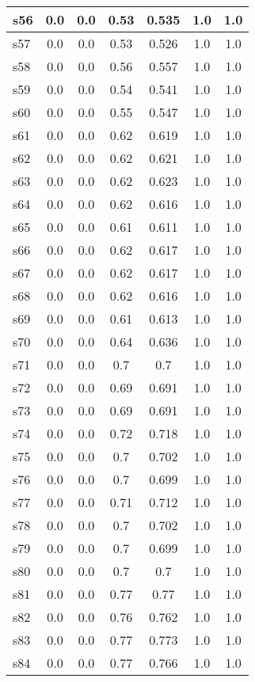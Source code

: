 \documentclass{article}
\begin{document}
\begin{tabular}{|l|c|c|c|c|c|c|}
\hline
s56 &0.0 & 0.0 & 0.53 & 0.535 & 1.0 & 1.0\\
\hline
s57 &0.0 & 0.0 & 0.53 & 0.526 & 1.0 & 1.0\\
\hline
s58 &0.0 & 0.0 & 0.56 & 0.557 & 1.0 & 1.0\\
\hline
s59 &0.0 & 0.0 & 0.54 & 0.541 & 1.0 & 1.0\\
\hline
s60 &0.0 & 0.0 & 0.55 & 0.547 & 1.0 & 1.0\\
\hline
s61 &0.0 & 0.0 & 0.62 & 0.619 & 1.0 & 1.0\\
\hline
s62 &0.0 & 0.0 & 0.62 & 0.621 & 1.0 & 1.0\\
\hline
s63 &0.0 & 0.0 & 0.62 & 0.623 & 1.0 & 1.0\\
\hline
s64 &0.0 & 0.0 & 0.62 & 0.616 & 1.0 & 1.0\\
\hline
s65 &0.0 & 0.0 & 0.61 & 0.611 & 1.0 & 1.0\\
\hline
s66 &0.0 & 0.0 & 0.62 & 0.617 & 1.0 & 1.0\\
\hline
s67 &0.0 & 0.0 & 0.62 & 0.617 & 1.0 & 1.0\\
\hline
s68 &0.0 & 0.0 & 0.62 & 0.616 & 1.0 & 1.0\\
\hline
s69 &0.0 & 0.0 & 0.61 & 0.613 & 1.0 & 1.0\\
\hline
s70 &0.0 & 0.0 & 0.64 & 0.636 & 1.0 & 1.0\\
\hline
s71 &0.0 & 0.0 & 0.7 & 0.7 & 1.0 & 1.0\\
\hline
s72 &0.0 & 0.0 & 0.69 & 0.691 & 1.0 & 1.0\\
\hline
s73 &0.0 & 0.0 & 0.69 & 0.691 & 1.0 & 1.0\\
\hline
s74 &0.0 & 0.0 & 0.72 & 0.718 & 1.0 & 1.0\\
\hline
s75 &0.0 & 0.0 & 0.7 & 0.702 & 1.0 & 1.0\\
\hline
s76 &0.0 & 0.0 & 0.7 & 0.699 & 1.0 & 1.0\\
\hline
s77 &0.0 & 0.0 & 0.71 & 0.712 & 1.0 & 1.0\\
\hline
s78 &0.0 & 0.0 & 0.7 & 0.702 & 1.0 & 1.0\\
\hline
s79 &0.0 & 0.0 & 0.7 & 0.699 & 1.0 & 1.0\\
\hline
s80 &0.0 & 0.0 & 0.7 & 0.7 & 1.0 & 1.0\\
\hline
s81 &0.0 & 0.0 & 0.77 & 0.77 & 1.0 & 1.0\\
\hline
s82 &0.0 & 0.0 & 0.76 & 0.762 & 1.0 & 1.0\\
\hline
s83 &0.0 & 0.0 & 0.77 & 0.773 & 1.0 & 1.0\\
\hline
s84 &0.0 & 0.0 & 0.77 & 0.766 & 1.0 & 1.0\\

\end{tabular}
\end{document}
